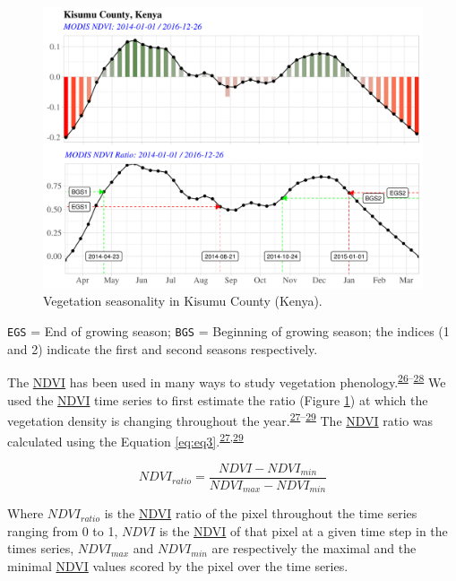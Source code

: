\documentclass[12pt,oneside]{article}
\begin{document}
\begin{figure}
\includegraphics[width=1\linewidth]{figures/Mapping_FBFS_vegetation_seasonality} \caption{Vegetation seasonality in Kisumu County (Kenya).}\label{fig:fig2}
\end{figure}

\texttt{EGS} = End of growing season; \texttt{BGS} = Beginning of growing season; the indices (1 and 2) indicate the first and second seasons respectively.

The \href{https://www.sciencedirect.com/science/article/pii/0034425779900130?via\%3Dihub}{NDVI} has been used in many ways to study vegetation phenology.\textsuperscript{\protect\hyperlink{ref-DeLeeuw_et_al_2012}{26}--\protect\hyperlink{ref-Yu_et_al_2012}{28}} We used the \href{https://www.sciencedirect.com/science/article/pii/0034425779900130?via\%3Dihub}{NDVI} time series to first estimate the ratio (Figure \ref{fig:fig2}) at which the vegetation density is changing throughout the year.\textsuperscript{\protect\hyperlink{ref-Yu_et_al_2010}{27}--\protect\hyperlink{ref-White_et_al_1997}{29}} The \href{https://www.sciencedirect.com/science/article/pii/0034425779900130?via\%3Dihub}{NDVI} ratio was calculated using the Equation \eqref{eq:eq3}.\textsuperscript{\protect\hyperlink{ref-Yu_et_al_2010}{27},\protect\hyperlink{ref-White_et_al_1997}{29}}

\begin{equation} 
NDVI_{ratio} =   \frac{NDVI-NDVI_{min}}{NDVI_{max} - NDVI_{min}}
\label{eq:eq3}
\end{equation}

Where \(NDVI_{ratio}\) is the \href{https://www.sciencedirect.com/science/article/pii/0034425779900130?via\%3Dihub}{NDVI} ratio of the pixel throughout the time series ranging from 0 to 1, \(NDVI\) is the \href{https://www.sciencedirect.com/science/article/pii/0034425779900130?via\%3Dihub}{NDVI} of that pixel at a given time step in the times series, \(NDVI_{max}\) and \(NDVI_{min}\) are respectively the maximal and the minimal \href{https://www.sciencedirect.com/science/article/pii/0034425779900130?via\%3Dihub}{NDVI} values scored by the pixel over the time series.
\end{document}

